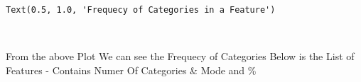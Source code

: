 \documentclass[11pt]{article}
\newcommand{\prompt}[4]{
        \llap{{\color{#2}[#3]: #4}}\vspace{-1.25em}
    }
\begin{document}
            \begin{tcolorbox}[breakable, boxrule=.5pt, size=fbox, pad at break*=1mm, opacityfill=0]
\prompt{Out}{outcolor}{16}{\hspace{3.5pt}}
\begin{Verbatim}[commandchars=\\\{\}]
Text(0.5, 1.0, 'Frequecy of Categories in a Feature')
\end{Verbatim}
\end{tcolorbox}
        
    \begin{center}
    \end{center}
    { \hspace*{\fill} \\}
    
     From the above Plot We can see the Frequecy of Categories Below is the
List of Features - Contains Numer Of Categories \& Mode and \% 
\end{document}
